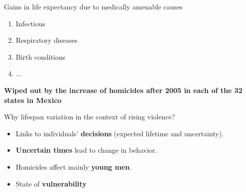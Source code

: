 \documentclass[xcolor={dvipsnames}]{beamer}
\begin{document}
\begin{frame}

\LARGE{

Gains in life expectancy due to medically amenable causes
\begin{enumerate}
\item Infectious
\item Respiratory diseases 
\item Birth conditions
\item ...
\end{enumerate}

 \pause
\begin{center}
\textbf{Wiped out by the increase of homicides after 2005 in each of the 32 states in Mexico}
\end{center}				

}
\end{frame}


\begin{frame}
\LARGE{
Why lifespan variation \pause in the context of rising violence?
\pause
		\begin{itemize}
		
		\item Links to individuals' \textbf{decisions} (expected lifetime and uncertainty). \pause

		\item \textbf{Uncertain times} lead to change in behavior. \pause
		
		\item Homicides affect mainly \textbf{young men}. \pause
		
		\item State of \textbf{vulnerability}
						
		\end{itemize}

}
\end{frame}
\end{document}
